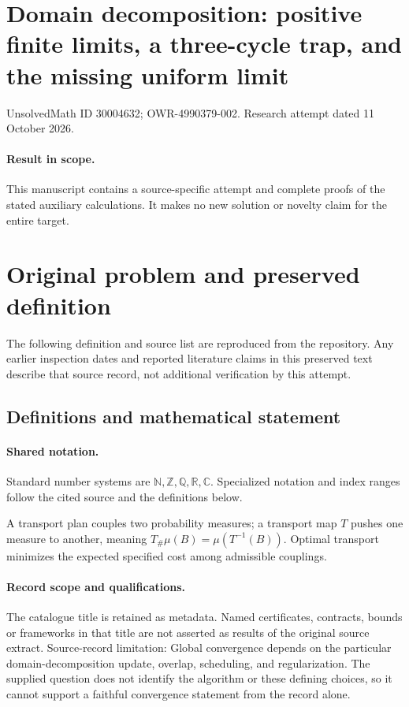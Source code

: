 \documentclass[11pt]{article}
\begin{document}
\section*{Domain decomposition: positive finite limits, a three-cycle trap, and the missing uniform limit}
\noindent UnsolvedMath ID 30004632; OWR-4990379-002. Research attempt dated 11 October 2026.
\paragraph{Result in scope.}This manuscript contains a source-specific attempt and complete proofs of the stated auxiliary calculations. It makes no new solution or novelty claim for the entire target.
\section{Original problem and preserved definition}
The following definition and source list are reproduced from the repository. Any earlier inspection dates and reported literature claims in this preserved text describe that source record, not additional verification by this attempt.
\subsection{Definitions and mathematical statement}

\paragraph{Shared notation.}Standard number systems are $\mathbb N,\mathbb Z,\mathbb Q,\mathbb R,\mathbb C$. Specialized notation and index ranges follow the cited source and the definitions below.


A transport plan couples two probability measures; a transport map $T$ pushes one measure to another, meaning $T_\#\mu(B)=\mu(T^{-1}(B))$. Optimal transport minimizes the expected specified cost among admissible couplings.
\paragraph{Record scope and qualifications.}
The catalogue title is retained as metadata. Named certificates, contracts, bounds or frameworks in that title are not asserted as results of the original source extract.
Source-record limitation: Global convergence depends on the particular domain-decomposition update, overlap, scheduling, and regularization. The supplied question does not identify the algorithm or these defining choices, so it cannot support a faithful convergence statement from the record alone.
\end{document}
